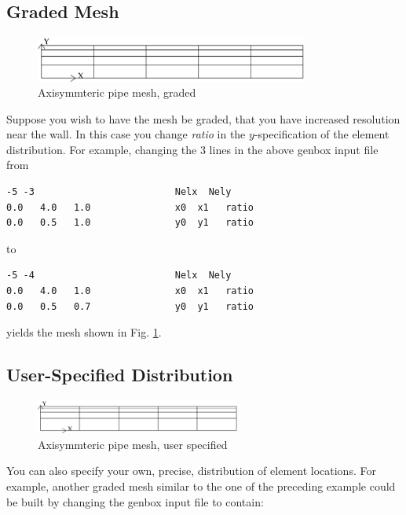 \subsection{Graded Mesh}
\begin{figure}
\centering
\includegraphics[width=0.8\textwidth]{Figs/mesh_axi2}
\caption{Axisymmteric pipe mesh, graded}
\label{fig:mesh_axi2}
\end{figure}

Suppose you wish to have the mesh be graded,
that you have increased resolution near the wall.
In this case you change {\em ratio} in the \(y\)-specification
of the element distribution.  For example, changing the 3 lines
in the above genbox input file from

\begin{verbatim}
-5 -3                         Nelx  Nely
0.0   4.0   1.0               x0  x1   ratio
0.0   0.5   1.0               y0  y1   ratio
\end{verbatim}

\noindent
to

\begin{verbatim}
-5 -4                         Nelx  Nely
0.0   4.0   1.0               x0  x1   ratio
0.0   0.5   0.7               y0  y1   ratio
\end{verbatim}

\noindent
yields the mesh shown in Fig. \ref{fig:mesh_axi2}.


\subsection{User-Specified Distribution}
\begin{figure}
\centering
\includegraphics[width=0.6\textwidth]{Figs/mesh_axi3}
\caption{Axisymmteric pipe mesh, user specified}
\label{fig:mesh_axi3}
\end{figure}

You can also specify your own, precise, distribution of element
locations.   For example, another graded mesh similar to the
one of the preceding example could be built by changing the
genbox input file to contain:


